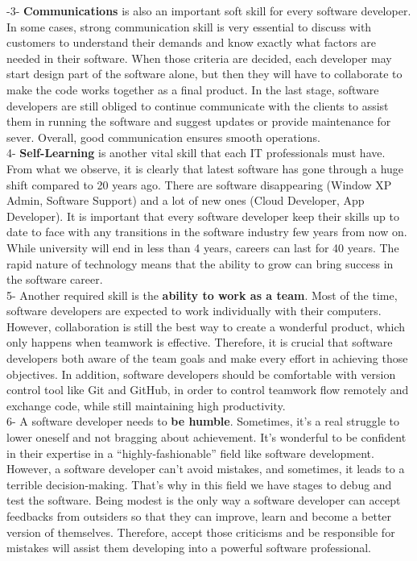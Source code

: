 \documentclass[a4paper, 11pt]{report}
\begin{document}
-3- \textbf{Communications} is also an important soft skill for every software developer. In some cases, strong communication skill is very essential to discuss with customers to understand their demands and know exactly what factors are needed in their software. When those criteria are decided, each developer may start design part of the software alone, but then they will have to collaborate to make the code works together as a final product. In the last stage, software developers are still obliged to continue communicate with the clients to assist them in running the software and suggest updates or provide maintenance for sever. Overall, good communication ensures smooth operations.\\

4- \textbf{Self-Learning} is another vital skill that each IT professionals must have. From what we observe, it is clearly that latest software has gone through a huge shift compared to 20 years ago. There are software disappearing (Window XP Admin, Software Support) and a lot of new ones (Cloud Developer, App Developer). It is important that every software developer keep their skills up to date to face with any transitions in the software industry few years from now on. While university will end in less than 4 years, careers can last for 40 years. The rapid nature of technology means that the ability to grow can bring success in the software career.\\

5- Another required skill is the \textbf{ability to work as a team}. Most of the time, software developers are expected to work individually with their computers. However, collaboration is still the best way to create a wonderful product, which only happens when teamwork is effective.  Therefore, it is crucial that software developers both aware of the team goals and make every effort in achieving those objectives. In addition, software developers should be comfortable with version control tool like Git and GitHub, in order to control teamwork flow remotely and exchange code, while still maintaining high productivity.\\

6- A software developer needs to \textbf{be humble}. Sometimes, it’s a real struggle to lower oneself and not bragging about achievement. It’s wonderful to be confident in their expertise in a “highly-fashionable” field like software development. However, a software developer can’t avoid mistakes, and sometimes, it leads to a terrible decision-making. That’s why in this field we have stages to debug and test the software. Being modest is the only way a software developer can accept feedbacks from outsiders so that they can improve, learn and become a better version of themselves. Therefore, accept those criticisms and be responsible for mistakes will assist them developing into a powerful software professional.\\
\end{document}
